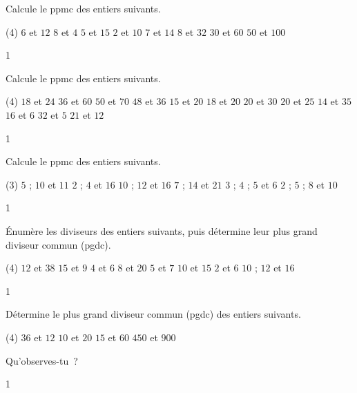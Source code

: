 \documentclass[a4paper,11pt]{report}
\begin{document}
\begin{exo}{
    Calcule le ppmc des entiers suivants.

\begin{tasks}(4)
    \task $6$ et $12$
    \task $8$ et $4$
    \task $5$ et $15$
    \task $2$ et $10$
    \task $7$ et $14$
    \task $8$ et $32$
    \task $30$ et $60$
    \task $50$ et $100$
\end{tasks}
}{1}\end{exo}


\begin{exo}{
    Calcule le ppmc des entiers suivants.


\begin{tasks}(4)
    \task $18$ et $24$
    \task $36$ et $60$
    \task $50$ et $70$
    \task $48$ et $36$
    \task $15$ et $20$
    \task $18$ et $20$
    \task $20$ et $30$
    \task $20$ et $25$
    \task $14$ et $35$
    \task $16$ et $6$
    \task $32$ et $5$
    \task $21$ et $12$
\end{tasks}
}{1}\end{exo}




\begin{exo}{
    Calcule le ppmc des entiers suivants.


\begin{tasks}(3)
    \task $5$ ; $10$ et $11$
    \task $2$ ; $4$ et $16$
    \task $10$ ; $12$  et $16$
    \task $7$ ; $14$ et $21$
    \task $3$ ; $4$ ; $5$ et $6$
    \task $2$ ; $5$ ; $8$ et $10$
\end{tasks}
}{1}\end{exo}



\begin{exo}{
    Énumère les diviseurs des entiers suivants, puis détermine leur plus grand diviseur commun (pgdc).
\begin{tasks}(4)
    \task $12$ et $38$
    \task $15$ et $9$
    \task $4$ et $6$
    \task $8$ et $20$
    \task $5$ et $7$
    \task $10$ et $15$
    \task $2$ et $6$
    \task $10$ ; $12$ et $16$
\end{tasks}
}{1}\end{exo}



\begin{exo}{
    Détermine le plus grand diviseur commun (pgdc) des entiers suivants.
\begin{tasks}(4)
        \task $36$ et $12$
        \task $10$ et $20$
        \task $15$ et $60$
        \task $450$ et $900$
\end{tasks}
Qu'observes-tu~?
}{1}\end{exo}
\end{document}
